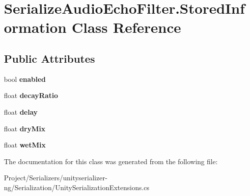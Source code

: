 \hypertarget{class_serialize_audio_echo_filter_1_1_stored_information}{}\section{Serialize\+Audio\+Echo\+Filter.\+Stored\+Information Class Reference}
\label{class_serialize_audio_echo_filter_1_1_stored_information}
\subsection*{Public Attributes}
\begin{DoxyCompactItemize}
\item 
\mbox{\label{class_serialize_audio_echo_filter_1_1_stored_information_a267d7fa82ff1bf5d2bdcd97c2ef16413}} 
bool {\bfseries enabled}
\item 
\mbox{\label{class_serialize_audio_echo_filter_1_1_stored_information_a5a57a72423fdd52354dbe3b9da178294}} 
float {\bfseries decay\+Ratio}
\item 
\mbox{\label{class_serialize_audio_echo_filter_1_1_stored_information_a595d86c193276a2a2ea4baa9bfac9151}} 
float {\bfseries delay}
\item 
\mbox{\label{class_serialize_audio_echo_filter_1_1_stored_information_ac5578bb71e7312675ab9a14941c6726f}} 
float {\bfseries dry\+Mix}
\item 
\mbox{\label{class_serialize_audio_echo_filter_1_1_stored_information_a9cf5cb8c7d3655d3ce2d8351a2646b0d}} 
float {\bfseries wet\+Mix}
\end{DoxyCompactItemize}


The documentation for this class was generated from the following file\+:\begin{DoxyCompactItemize}
\item 
Project/\+Serializers/unityserializer-\/ng/\+Serialization/Unity\+Serialization\+Extensions.\+cs\end{DoxyCompactItemize}
